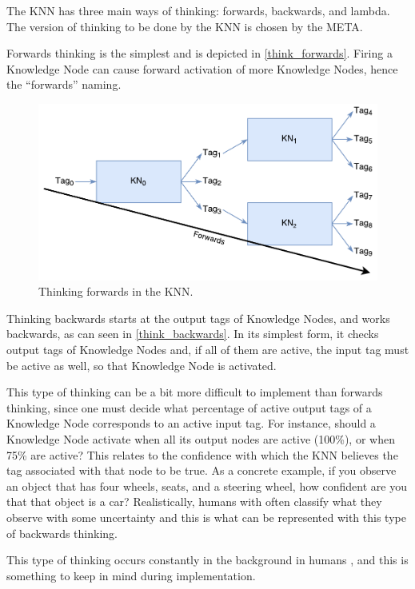 \documentclass[titlepage,11pt]{article}
\begin{document}
The KNN has three main ways of thinking: forwards, backwards, and lambda. The version of thinking to be done by the KNN is chosen by the META.

Forwards thinking is the simplest and is depicted in \autoref{think_forwards}. Firing a Knowledge Node can cause forward activation of more Knowledge Nodes, hence the ``forwards'' naming.

\begin{figure}[!htb]
	\includegraphics[width=\columnwidth]{figures/forwards_thinking.pdf}
	\caption{Thinking forwards in the KNN.}
	\label{think_forwards}
\end{figure}

Thinking backwards starts at the output tags of Knowledge Nodes, and works backwards, as can seen in \autoref{think_backwards}. In its simplest form, it checks output tags of Knowledge Nodes and, if all of them are active, the input tag must be active as well, so that Knowledge Node is activated.

This type of thinking can be a bit more difficult to implement than forwards thinking, since one must decide what percentage of active output tags of a Knowledge Node corresponds to an active input tag. For instance, should a Knowledge Node activate when all its output nodes are active (100\%), or when 75\% are active? This relates to the confidence with which the KNN believes the tag associated with that node to be true. As a concrete example, if you observe an object that has four wheels, seats, and a steering wheel, how confident are you that that object is a car? Realistically, humans with often classify what they observe with some uncertainty \cite{uncertainty} and this is what can be represented with this type of backwards thinking.

This type of thinking occurs constantly in the background in humans \cite{vybihal-knowledge}, and this is something to keep in mind during implementation.
\end{document}

